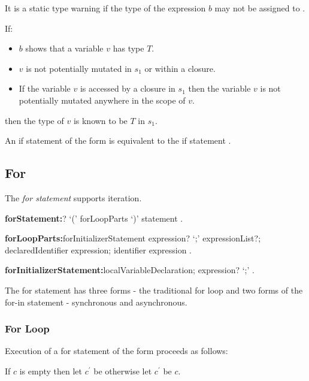 \documentclass{article}
\begin{document}
\LMHash{}
It is a static type warning if the type of the expression $b$ may not be assigned to .

\LMHash{}
If:
\begin{itemize}
\item $b$ shows that a variable $v$ has type $T$.
\item $v$ is not potentially mutated in $s_1$ or within a closure.
\item If the variable $v$ is accessed by a closure in $s_1$ then the variable $v$ is not potentially mutated anywhere in the scope of $v$.
\end{itemize}
then the type of $v$ is known to be $T$ in $s_1$.

\LMHash{}
An if statement of the form  is equivalent to the if statement .


\subsection{For}

\LMHash{}
The {\em for statement} supports iteration.

\begin{grammar}
{\bf forStatement:}\AWAIT? \FOR{} `(' forLoopParts `)' statement
  .

{\bf forLoopParts:}forInitializerStatement expression? `{\escapegrammar ;}' expressionList?;
  declaredIdentifier \IN{} expression;
  identifier \IN{} expression
  .

{\bf forInitializerStatement:}localVariableDeclaration;
  expression? `{\escapegrammar ;}'
  .
\end{grammar}

\LMHash{}
 The for statement has three forms - the traditional for loop and two forms of the for-in statement - synchronous and asynchronous.


\subsubsection{For Loop}

\LMHash{}
Execution of a for statement of the form  proceeds as follows:

\LMHash{}
If $c$ is empty then let $c^\prime$ be \TRUE{} otherwise let $c^\prime$ be $c$.
\end{document}
